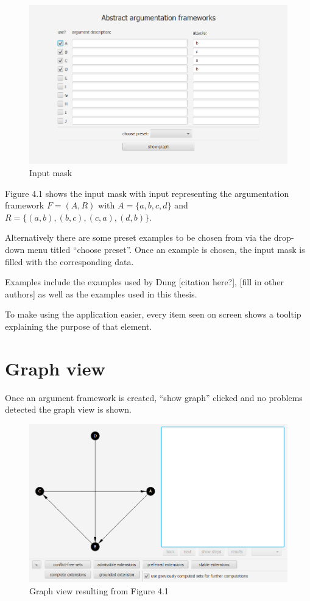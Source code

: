 \documentclass[draft,final]{vutinfth} %
\newcommand{\hl}{\par\vspace{6pt}} %
\begin{document}
\FloatBarrier
	\begin{figure}[!h]
		\centering
		\includegraphics[width=\linewidth]{pics/input.png}
		\caption{Input mask}
	\end{figure}
\FloatBarrier

Figure 4.1 shows the input mask with input representing the argumentation framework $F=(A,R)$ with $A=\{a,b,c,d\}$ and $R=\{(a,b),(b,c),(c,a),(d,b)\}$.\hl

Alternatively there are some preset examples to be chosen from via the drop-down menu titled ``choose preset''. Once an example is chosen, the input mask is filled with the corresponding data.\hl
Examples include the examples used by Dung [citation here?], [fill in other authors] as well as the examples used in this thesis.\hl
To make using the application easier, every item seen on screen shows a tooltip explaining the purpose of that element.

\section{Graph view}
Once an argument framework is created, ``show graph'' clicked and no problems detected the graph view is shown.

\FloatBarrier
	\begin{figure}[!h]
		\centering
		\includegraphics[width=\linewidth]{pics/demo.png}
		\caption{Graph view resulting from Figure 4.1}
	\end{figure}
\FloatBarrier
\end{document}
